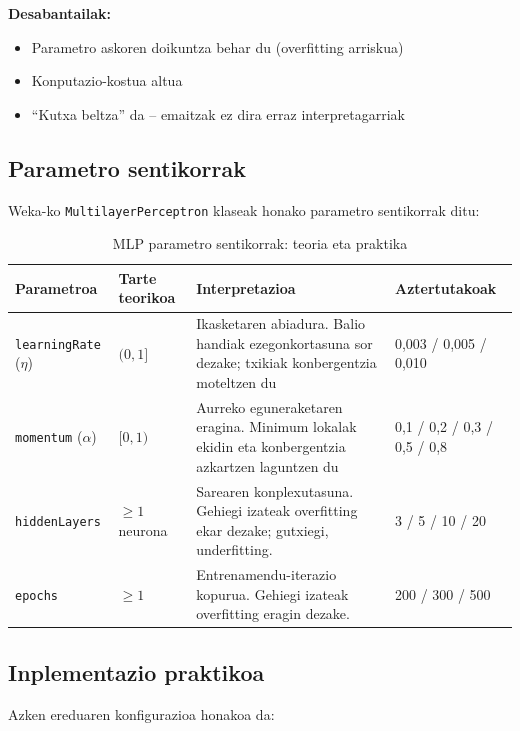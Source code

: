 \documentclass[12pt, a4paper]{article}
\begin{document}
\textbf{Desabantailak:}
\begin{itemize}
    \item Parametro askoren doikuntza behar du (overfitting arriskua)
    \item Konputazio-kostua altua
    \item ``Kutxa beltza'' da -- emaitzak ez dira erraz interpretagarriak
\end{itemize}

\subsection{Parametro sentikorrak}

Weka-ko \texttt{MultilayerPerceptron} klaseak honako parametro sentikorrak ditu:

\begin{table}[H]
    \centering
    \caption{MLP parametro sentikorrak: teoria eta praktika}
    \begin{tabular}{p{2.5cm}p{2.2cm}p{4cm}p{3cm}}
        \toprule
        \textbf{Parametroa} & \textbf{Tarte teorikoa} & \textbf{Interpretazioa} &
        \textbf{Aztertutakoak} \\
        \midrule
        \texttt{learningRate} ($\eta$) & $(0, 1]$ &
        Ikasketaren abiadura. Balio handiak ezegonkortasuna sor dezake; txikiak konbergentzia moteltzen du &
        0,003 / 0,005 / 0,010 \\
        \midrule
        \texttt{momentum} ($\alpha$) & $[0, 1)$ &
        Aurreko eguneraketaren eragina. Minimum lokalak ekidin eta konbergentzia azkartzen laguntzen du &
        0,1 / 0,2 / 0,3 / 0,5 / 0,8 \\
        \midrule
        \texttt{hiddenLayers} & $\geq 1$ neurona &
        Sarearen konplexutasuna. Gehiegi izateak overfitting ekar dezake; gutxiegi, underfitting. &
        3 / 5 / 10 / 20 \\
        \midrule
        \texttt{epochs} & $\geq 1$ &
        Entrenamendu-iterazio kopurua. Gehiegi izateak overfitting eragin dezake. &
        200 / 300 / 500 \\
        \bottomrule
    \end{tabular}
    \label{tab:parametroak}
\end{table}

\subsection{Inplementazio praktikoa}
Azken ereduaren konfigurazioa honakoa da:
\end{document}
